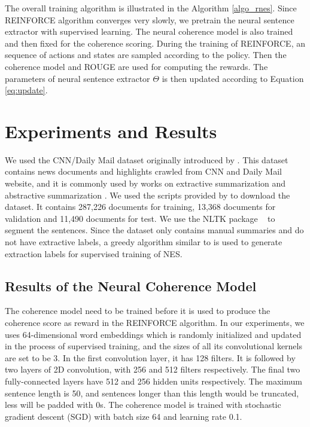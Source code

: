 \documentclass[letterpaper]{article} %
\begin{document}
	The overall training algorithm is illustrated in the Algorithm \ref{algo_rnes}. Since REINFORCE algorithm converges very slowly, we pretrain the neural sentence extractor with supervised learning. The neural coherence model is also trained and then fixed for the coherence scoring. During the training of REINFORCE, an sequence of actions and states are sampled
	according to the policy. Then the coherence model and ROUGE are used for computing the rewards. The parameters of neural sentence extractor $\Theta$ is then updated according to Equation \ref{eq:update}. 
	
	
	\section{Experiments and Results}

	We used the CNN/Daily Mail dataset originally introduced by \cite{hermann_teaching_2015}. This dataset contains news documents and highlights crawled from CNN and Daily Mail website, and it is commonly used by works on extractive summarization \cite{jianpeng2016,SummaRuNNer} and abstractive summarization \cite{nallapati_ramesh_abstractive_2016,see_get_2017}. We used the scripts provided by \cite{hermann_teaching_2015} to download the dataset. It contains 287,226 documents for training, 13,368 documents for validation and 11,490 documents for test. We use the NLTK package ~\cite{nltk} to segment the sentences. Since the dataset only contains manual summaries and do not have extractive labels, a greedy algorithm similar to \cite{SummaRuNNer} is used to generate extraction labels for supervised training of NES.
	 
	\subsection{Results of the Neural Coherence Model}
	The coherence model need to be trained before it is used to produce the coherence score as reward in the REINFORCE algorithm. In our experiments,  we uses 64-dimensional word embeddings which is randomly initialized and updated in the process of supervised training, and the sizes of all its convolutional kernels are set to be 3. In the first convolution layer, it has 128 filters. It is followed by two layers of 2D convolution, with 256 and 512 filters respectively. The final two fully-connected layers have 512 and 256 hidden units respectively. The maximum sentence length is 50, and sentences longer than this length would be truncated, less will be padded with 0s. The coherence model is trained with stochastic gradient descent (SGD) with batch size 64 and learning rate 0.1. 
\end{document}
